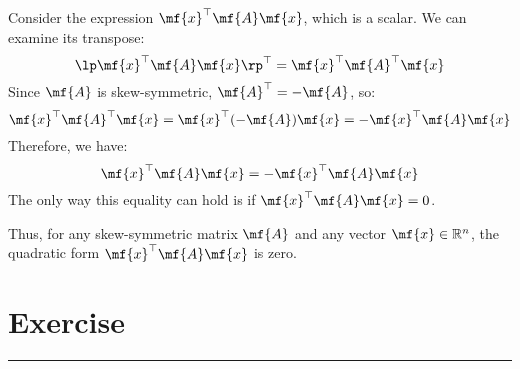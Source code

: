 \begin{enumerate}
\begin{boxedstuff}
        Consider the expression $\mf{x}^\top \mf{A} \mf{x}$, which is a scalar. We can examine its transpose:
        \[
        \lp \mf{x}^\top \mf{A} \mf{x} \rp^\top = \mf{x}^\top \mf{A}^\top \mf{x}
        \]
        Since $\mf{A}$ is skew-symmetric, $\mf{A}^\top = -\mf{A}$, so:
        \[
        \mf{x}^\top \mf{A}^\top \mf{x} = \mf{x}^\top (-\mf{A}) \mf{x} = -\mf{x}^\top \mf{A} \mf{x}
        \]
        Therefore, we have:
        \[
        \mf{x}^\top \mf{A} \mf{x} = -\mf{x}^\top \mf{A} \mf{x}
        \]
        The only way this equality can hold is if $\mf{x}^\top \mf{A} \mf{x} = 0$.

        Thus, for any skew-symmetric matrix $\mf{A}$ and any vector $\mf{x} \in \mathbb{R}^n$, the quadratic form $\mf{x}^\top \mf{A} \mf{x}$ is zero.
    \end{boxedstuff}

\end{enumerate}
\newpage

\section{Exercise}
\vspace{-0.5cm}
\begin{center}
    \rule{\textwidth}{1pt}
\end{center}

